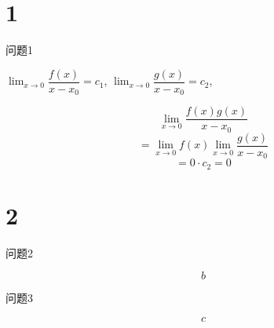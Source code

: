 \documentclass[ebook,fleqn]{problemset}
\begin{document}
\chapter{1}
\begin{problem}
  问题1
\end{problem}

\begin{solution}
  $\lim_{x \to 0} \dfrac{f(x)}{x-x_0} = c_1$,
  $\lim_{x \to 0} \dfrac{g(x)}{x-x_0} = c_2$,

  \[
    \lim_{x\to0} \dfrac{f(x)g(x)}{x-x_0}
  \]
  \[
   = \lim_{x\to0} f(x) \lim_{x \to 0} \dfrac{g(x)}{x-x_0}
  \]
  \[
    = 0 \cdot c_2 = 0
  \]
\end{solution}
\chapter{2}

\begin{problem}
  问题2
\end{problem}
\begin{solution}
    \[b\]
\end{solution}
\begin{problem}
  问题3
\end{problem}
\begin{solution}
    \[c\]
\end{solution}
\end{document}
